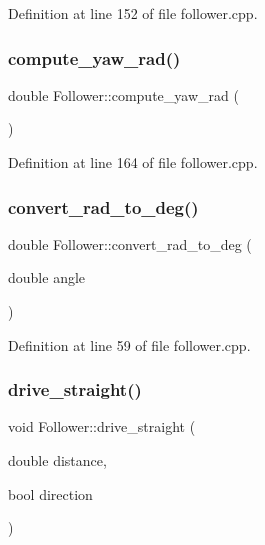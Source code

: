Definition at line 152 of file follower.\+cpp.

\mbox{\label{class_follower_abde593631e6549062d77fb2169a17c66}} 
\subsubsection{\texorpdfstring{compute\+\_\+yaw\+\_\+rad()}{compute\_yaw\_rad()}}
{\footnotesize\ttfamily double Follower\+::compute\+\_\+yaw\+\_\+rad (\begin{DoxyParamCaption}{ }\end{DoxyParamCaption})}



Definition at line 164 of file follower.\+cpp.

\mbox{\label{class_follower_a670f07466502e1020514d6ba6b928553}} 
\subsubsection{\texorpdfstring{convert\+\_\+rad\+\_\+to\+\_\+deg()}{convert\_rad\_to\_deg()}}
{\footnotesize\ttfamily double Follower\+::convert\+\_\+rad\+\_\+to\+\_\+deg (\begin{DoxyParamCaption}\item[{double}]{angle }\end{DoxyParamCaption})}



Definition at line 59 of file follower.\+cpp.

\mbox{\label{class_follower_ad4d1ce6f43ce65c0aa5a560247ca55ad}} 
\subsubsection{\texorpdfstring{drive\+\_\+straight()}{drive\_straight()}}
{\footnotesize\ttfamily void Follower\+::drive\+\_\+straight (\begin{DoxyParamCaption}\item[{double}]{distance,  }\item[{bool}]{direction }\end{DoxyParamCaption})}



